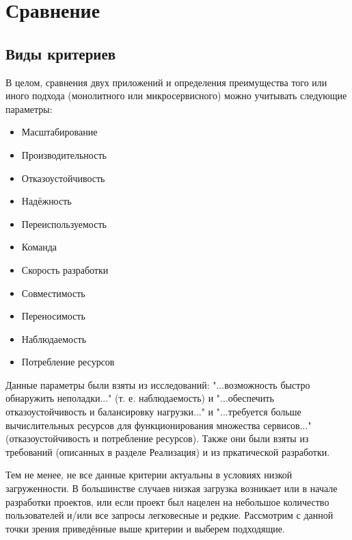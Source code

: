 \section{Сравнение}

\subsection{Виды критериев}
    В целом, сравнения двух приложений и определения преимущества того или иного подхода (монолитного или микросервисного) можно учитывать следующие параметры:

    \begin{itemize}
        \item Масштабирование
        \item Производительность
        \item Отказоустойчивость
        \item Надёжность
        \item Переиспользуемость
        \item Команда
        \item Скорость разработки
        \item Совместимость
        \item Переносимость
        \item Наблюдаемость
        \item Потребление ресурсов
    \end{itemize}

    Данные параметры были взяты из исследований: "...возможность быстро обнаружить неполадки..." \cite{шитько2017проектирование} (т. е. наблюдаемость) и "...обеспечить отказоустойчивость и балансировку нагрузки..." и "...требуется больше вычислительных ресурсов для функционирования множества сервисов..." \cite{артамонов2016разработка} (отказоустойчивость и потребление ресурсов). Также они были взяты из требований (описанных в разделе Реализация) и из пркатической разработки.

    Тем не менее, не все данные критерии актуальны в условиях низкой загруженности. В большинстве случаев низкая загрузка возникает или в начале разработки проектов, или если проект был нацелен на небольшое количество пользователей и/или все запросы легковесные и редкие. Рассмотрим с данной точки зрения приведённые выше критерии и выберем подходящие.

